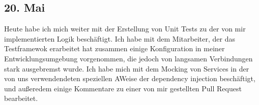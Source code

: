 \subsection{20. Mai}
Heute habe ich mich weiter mit der Erstellung von Unit Tests zu der von mir implementierten Logik beschäftigt. Ich habe mit dem Mitarbeiter, der das Testframewok erarbeitet hat zusammen einige Konfiguration in meiner Entwicklungsumgebung vorgenommen, die jedoch von langsamen Verbindungen stark ausgebremst wurde. Ich habe mich mit dem Mocking von Services in der von uns verwendendeten speziellen AWeise der dependency injection beschäftigt, und außeredem einige Kommentare zu einer von mir gestellten Pull Request bearbeitet.